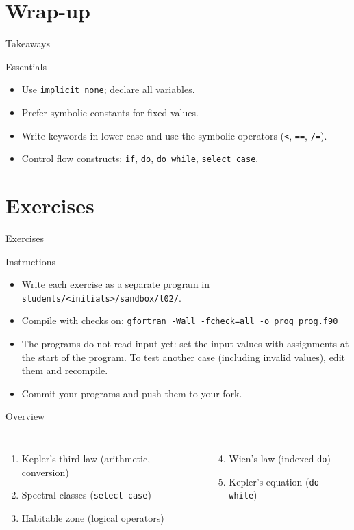 \section{Wrap-up}

\begin{frame}{Takeaways}
  \begin{block}{Essentials}
  \begin{itemize}
    \item Use \texttt{implicit none}; declare all variables.
    \item Prefer symbolic constants for fixed values.
    \item Write keywords in lower case and use the symbolic operators (\texttt{<}, \texttt{==}, \texttt{/=}).
    \item Control flow constructs: \texttt{if}, \texttt{do}, \texttt{do while}, \texttt{select case}.
  \end{itemize}
  \end{block}
\end{frame}

\section{Exercises}

\begin{frame}{Exercises}
  \begin{block}{Instructions}
  \begin{itemize}
    \item Write each exercise as a separate program in \texttt{students/<initials>/sandbox/l02/}.
    \item Compile with checks on: \texttt{gfortran -Wall -fcheck=all -o prog prog.f90}
    \item The programs do not read input yet: set the input values with assignments at the start of the program. To test another case (including invalid values), edit them and recompile.
    \item Commit your programs and push them to your fork.
  \end{itemize}
  \end{block}
  \begin{block}{Overview}
  \begin{columns}[T]
    \begin{enumerate}
      \item Kepler's third law (arithmetic, conversion)
      \item Spectral classes (\texttt{select case})
      \item Habitable zone (logical operators)
    \end{enumerate}
    \begin{enumerate}
      \setcounter{enumi}{3}
      \item Wien's law (indexed \texttt{do})
      \item Kepler's equation (\texttt{do while})
    \end{enumerate}
  \end{columns}
  \end{block}
\end{frame}

